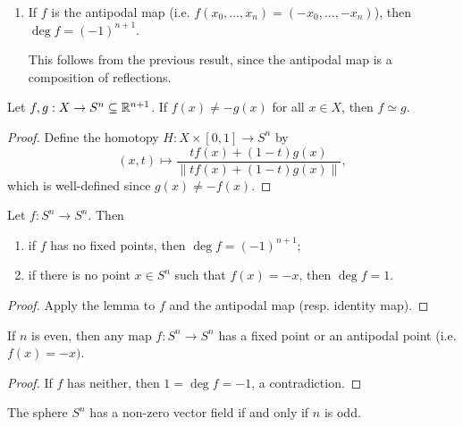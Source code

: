 \begin{remark}
\begin{enumerate}
      This completes the proof by induction since
      we already know the result for $\partial D^n_- \cong S^{n - 1}$.
    \item If $f$ is the antipodal map (i.e.
      $f(x_0, \dots, x_n) = (-x_0, \dots, -x_n)$), then $\deg f = (-1)^{n + 1}$.

      This follows from the previous result, since the
      antipodal map is a composition of reflections.
  \end{enumerate}
\end{remark}

\begin{lemma}
  Let $f, g : X \to S^n \subseteq \mathbb{R}^{n + 1}$.
  If $f(x) \ne -g(x)$ for all $x \in X$, then $f \simeq g$.
\end{lemma}

\begin{proof}
  Define the homotopy $H : X \times [0, 1] \to S^n$ by
  \[
    (x, t) \longmapsto \frac{t f(x) + (1 - t) g(x)}{\|t f(x) + (1 - t) g(x)\|},
  \]
  which is well-defined since $g(x) \ne -f(x)$.
\end{proof}

\begin{corollary}
  Let $f : S^n \to S^n$. Then
  \begin{enumerate}
    \item if $f$ has no fixed points, then $\deg f = (-1)^{n + 1}$;
    \item if there is no point $x \in S^n$ such that
      $f(x) = -x$, then $\deg f = 1$.
  \end{enumerate}
\end{corollary}

\begin{proof}
  Apply the lemma to $f$ and the antipodal map
  (resp. identity map).
\end{proof}

\begin{corollary}
  If $n$ is even, then any map $f : S^n \to S^n$
  has a fixed point or an antipodal point
  (i.e. $f(x) = -x)$.
\end{corollary}

\begin{proof}
  If $f$ has neither, then $1 = \deg f = -1$, a
  contradiction.
\end{proof}

\begin{corollary}
  The sphere $S^n$ has a non-zero vector field if
  and only if $n$ is odd.
\end{corollary}


